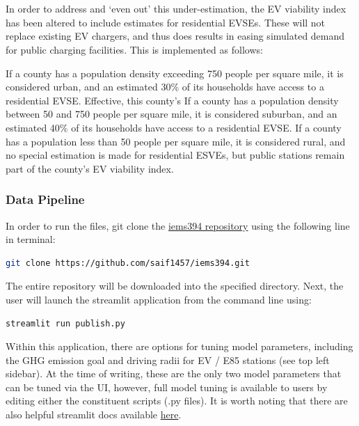 \documentclass[answers]{exam}
\begin{document}
\\ ~\\
In order to address and `even out' this under-estimation, the EV viability index has been altered to include estimates for residential EVSEs. These will not replace existing EV chargers, and thus does results in easing simulated demand for public charging facilities. This is implemented as follows:
\begin{outline}
\1 If a county has a population density exceeding 750 people per square mile, it is considered urban, and an estimated 30\% of its households have access to a residential EVSE. Effective, this county's 
\1 If a county has a population density between 50 and 750 people per square mile, it is considered suburban, and an estimated 40\% of its households have access to a residential EVSE.
\1 If a county has a population less than 50 people per square mile, it is considered rural, and no special estimation is made for residential ESVEs, but public stations remain part of the county's EV viability index.
\end{outline}
\newpage
\subsubsection{Data Pipeline}

In order to run the files, git clone the \href{https://github.com/saif1457/iems394}{iems394 repository} using the following line in terminal:
% 
\begin{lstlisting}[language=bash, caption=Git Clone]
git clone https://github.com/saif1457/iems394.git
\end{lstlisting}

The entire repository will be downloaded into the specified directory. Next, the user will launch the streamlit application from the command line using:
\begin{lstlisting}[language=bash, caption=Running 394combo.ipynb]
streamlit run publish.py
\end{lstlisting}

Within this application, there are options for tuning model parameters, including the GHG emission goal and driving radii for EV / E85 stations (see top left sidebar). At the time of writing, these are the only two model parameters that can be tuned via the UI, however, full model tuning is available to users by editing either the constituent scripts (.py files). It is worth noting that there are also helpful streamlit docs available \href{https://docs.streamlit.io/en/stable/}{here}. 
\end{document}

